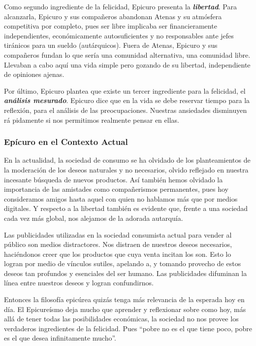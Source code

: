 \documentclass{article}
\begin{document}
Como segundo ingrediente de la felicidad, Epicuro presenta la \textit{\textbf{libertad}}. Para alcanzarla, Epicuro y sus compañeros abandonan Atenas y su atmósfera competitiva por completo, pues ser libre implicaba ser financieramente independientes, económicamente autosuficientes y no responsables ante jefes tiránicos para un sueldo (autárquicos). Fuera de Atenas, Epicuro y sus compañeros fundan lo que sería una comunidad alternativa, una comunidad libre. Llevaban a cabo aquí una vida simple pero gozando de su libertad, independiente de opiniones ajenas.

Por último, Epicuro plantea que existe un tercer ingrediente para la felicidad, el \textit{\textbf{análisis mesurado}}. Epicuro dice que en la vida se debe reservar tiempo para la reflexión, para el análisis de las preocupaciones. Nuestras ansiedades disminuyen rá    pidamente si nos permitimos realmente pensar en ellas.

\subsubsection{Epícuro en el Contexto Actual}

En la actualidad, la sociedad de consumo se ha olvidado de los planteamientos de la moderación de los deseos naturales y no necesarios, olvido reflejado en nuestra incesante búsqueda de nuevos productos. Así también hemos olvidado la importancia de las amistades como compañerismos permanentes, pues hoy consideramos amigos hasta aquel con quien no hablamos más que por medios digitales. Y respecto a la libertad también es evidente que, frente a una sociedad cada vez más global, nos alejamos de la adorada autarquía.

Las publicidades utilizadas en la sociedad consumista actual para vender al público son medios distractores. Nos distraen de nuestros deseos necesarios, haciéndonos creer que los productos que cuya venta incitan los son. Esto lo logran por medio de vínculos sutiles, apelando a, y tomando provecho de estos deseos tan profundos y esenciales del ser humano. Las publicidades difuminan la línea entre nuestros deseos y logran confundirnos.

Entonces la filosofía epicúrea quizás tenga más relevancia de la esperada hoy en día. El Epicureísmo deja mucho que aprender y reflexionar sobre como hoy, más allá de tener todas las posibilidades económicas, la sociedad no nos provee los verdaderos ingredientes de la felicidad. Pues ``pobre no es el que tiene poco, pobre es el que desea infinitamente mucho''. 
\end{document}
